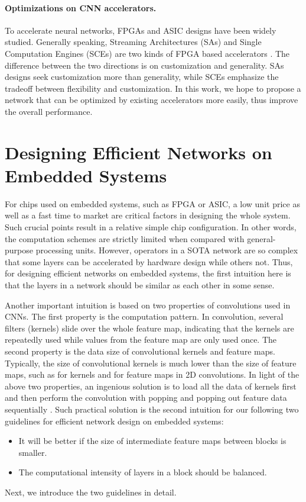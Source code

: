 \documentclass{article}
\begin{document}
\paragraph{Optimizations on CNN accelerators.}
To accelerate neural networks, FPGAs \cite{FarabetPHL09, ZhangLSGXC15, gupta2015deep, ma2017optimizing} and ASIC designs \cite{chen2014diannao, reagen2016minerva, jouppi2017datacenter, luo2017dadiannao, hegde2018ucnn} have been widely studied. 
Generally speaking, Streaming Architectures (SAs) \cite{venieris2017fpgaconvnet, xiao2017exploring} and Single Computation Engines (SCEs) \cite{guo2016angel, chang2017compiling, abdelfattah2018dla} are two kinds of FPGA based accelerators \cite{venieris2018toolflows}. 
The difference between the two directions is on customization and generality. SAs designs seek customization more than generality, while SCEs emphasize the tradeoff between flexibility and customization. 
In this work, we hope to propose a network that can be optimized by existing accelerators more easily, thus improve the overall performance. 


\section{Designing Efficient Networks on Embedded Systems}
For chips used on embedded systems, such as FPGA or ASIC, a low unit price as well as a fast time to market are critical factors in designing the whole system. Such crucial points result in a relative simple chip configuration. In other words, the computation schemes are strictly limited  when compared with general-purpose processing units.
However, operators in a SOTA network are so complex that some layers can be accelerated by hardware design while others not.
Thus, for designing efficient networks on embedded systems, the first intuition here is that the layers in a network should be similar as each other in some sense. 

Another important intuition is based on two properties of convolutions used in CNNs. The first property is the computation pattern. In convolution, several filters (kernels) slide over the whole feature map, indicating that the kernels are repeatedly used while values from the feature map are only used once. The second property is the data size of convolutional kernels and feature maps. Typically, the size of convolutional kernels is much lower than the size of feature maps, such as  for kernels and  for feature maps in 2D convolutions. 
In light of the above two properties, an ingenious solution is to load all the data of kernels first and then perform the convolution with popping and popping out feature data sequentially \cite{xing2019dnnvm} .
Such practical solution is the second intuition for our following two guidelines for efficient network design on embedded systems:
\begin{itemize}
\item It will be better if the size of intermediate feature maps between blocks is smaller.
\item The computational intensity of layers in a block should be balanced.
\end{itemize}
Next, we introduce the two guidelines in detail.
\end{document}
